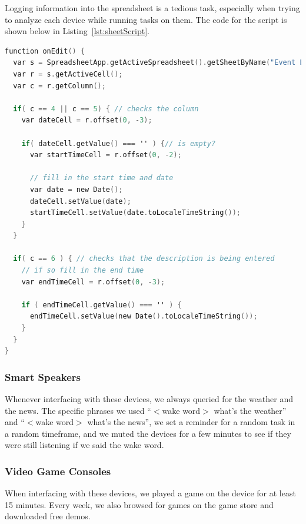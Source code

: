 Logging information into the spreadsheet is a tedious task, especially when trying to analyze each device while running tasks on them. The code for the script is shown below in Listing~\ref{lst:sheetScript}.

\noindent
\begin{minipage}{\textwidth}
\begin{lstlisting}[basicstyle=\linespread{0.95}\ttfamily, language=C,label={lst:sheetScript},caption={Open and Read from a Socket}]
function onEdit() {
  var s = SpreadsheetApp.getActiveSpreadsheet().getSheetByName("Event Log");
  var r = s.getActiveCell();
  var c = r.getColumn();

  if( c == 4 || c == 5) { // checks the column
    var dateCell = r.offset(0, -3);

    if( dateCell.getValue() === '' ) {// is empty?
      var startTimeCell = r.offset(0, -2);

      // fill in the start time and date
      var date = new Date();
      dateCell.setValue(date);
      startTimeCell.setValue(date.toLocaleTimeString());
    }
  }

  if( c == 6 ) { // checks that the description is being entered
    // if so fill in the end time
    var endTimeCell = r.offset(0, -3);

    if ( endTimeCell.getValue() === '' ) {
      endTimeCell.setValue(new Date().toLocaleTimeString());
    }
  }
}
\end{lstlisting}
\end{minipage}

\subsubsection{Smart Speakers}

Whenever interfacing with these devices, we always queried for the weather and the news. The specific phrases we used ``$<$wake word$>$ what's the weather'' and ``$<$wake word$>$ what's the news'', we  set a reminder for a random task in a random timeframe, and we muted the devices for a few minutes to see if they were still listening if we said the wake word.

\subsubsection{Video Game Consoles}

When interfacing with these devices, we played a game on the device for at least 15 minutes. Every week, we also browsed for games on the game store and downloaded free demos.

